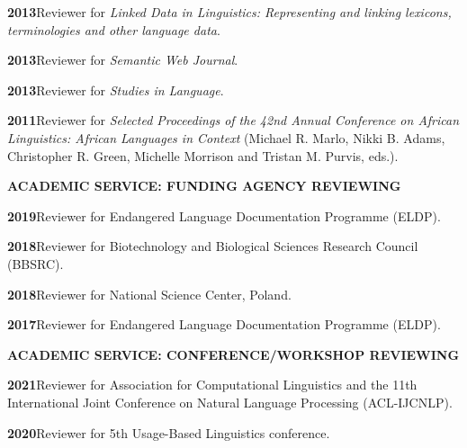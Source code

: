 \documentclass[11pt]{article}
\newcommand{\hangpara}{
 \setlength{\parindent}{0in} %
 \hangindent=0.42in %
}
\begin{document}
\vskip 6pt
\hangpara
{\bf 2013}\hspace{1ex}Reviewer for \textit{Linked Data in Linguistics: Representing and linking lexicons, terminologies and other language data}.

\vskip 6pt
\hangpara
{\bf 2013}\hspace{1ex}Reviewer for \textit{Semantic Web Journal}.

\vskip 6pt
\hangpara
{\bf 2013}\hspace{1ex}Reviewer for \textit{Studies in Language}.

\vskip 6pt
\hangpara
{\bf 2011}\hspace{1ex}Reviewer for \textit{Selected Proceedings of the 42nd Annual Conference on African Linguistics: African Languages in Context} (Michael R. Marlo, Nikki B. Adams, Christopher R. Green, Michelle Morrison and Tristan M. Purvis, eds.).


\vskip 20pt
\begin{flushleft}
{\bf ACADEMIC SERVICE: FUNDING AGENCY REVIEWING}
\end{flushleft}

\hangpara
{\bf 2019}\hspace{1ex}Reviewer for Endangered Language Documentation Programme (ELDP).

\vskip 6pt
\hangpara
{\bf 2018}\hspace{1ex}Reviewer for Biotechnology and Biological Sciences Research Council (BBSRC).

\vskip 6pt
\hangpara
{\bf 2018}\hspace{1ex}Reviewer for National Science Center, Poland.

\vskip 6pt
\hangpara
{\bf 2017}\hspace{1ex}Reviewer for Endangered Language Documentation Programme (ELDP).


\vskip 20pt
\begin{flushleft}
{\bf ACADEMIC SERVICE: CONFERENCE/WORKSHOP REVIEWING}
\end{flushleft}


\hangpara
{\bf 2021}\hspace{1ex}Reviewer for Association for Computational Linguistics and the 11th International Joint Conference on Natural Language Processing (ACL-IJCNLP).

\vskip 6pt
\hangpara
{\bf 2020}\hspace{1ex}Reviewer for 5th Usage-Based Linguistics conference.
\end{document}
